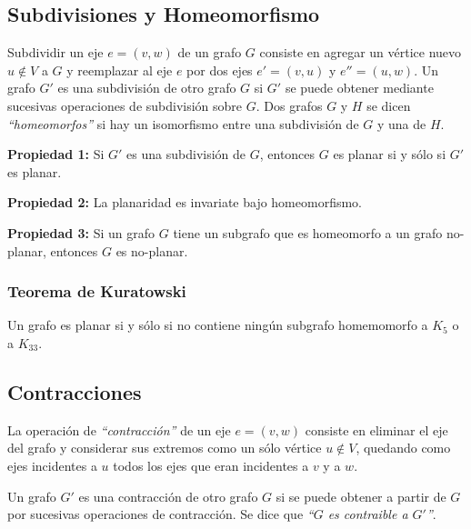 \subsection{Subdivisiones y Homeomorfismo}

Subdividir un eje $e = (v,w)$ de un grafo $G$ consiste en agregar un v\'ertice nuevo $u \not\in V$ a $G$ y reemplazar al eje $e$ por dos ejes $e' = (v, u)$ y $e'' = (u, w)$. Un grafo $G'$ es una subdivisi\'on de otro grafo $G$ si $G'$ se puede obtener mediante sucesivas operaciones de subdivisi\'on sobre $G$. Dos grafos $G$ y $H$ se dicen \emph{``homeomorfos''} si hay un isomorfismo entre una subdivisi\'on de $G$ y una de $H$.

\begin{badidea}
\textbf{Propiedad 1:} Si $G'$ es una subdivisi\'on de $G$, entonces $G$ es planar si y s\'olo si $G'$ es planar.
\end{badidea}

\begin{badidea}
\textbf{Propiedad 2:} La planaridad es invariate bajo homeomorfismo.
\end{badidea}

\begin{badidea}
\textbf{Propiedad 3:} Si un grafo $G$ tiene un subgrafo que es homeomorfo a un grafo no-planar, entonces $G$ es no-planar.
\end{badidea}

\subsubsection{Teorema de Kuratowski}

Un grafo es planar si y s\'olo si no contiene ning\'un subgrafo homemomorfo a $K_5$ o a $K_{33}$.

\subsection{Contracciones}

La operaci\'on de \emph{``contracci\'on''} de un eje $e = (v, w)$ consiste en eliminar el eje del grafo y considerar sus extremos como un s\'olo v\'ertice $u \not\in V$, quedando como ejes incidentes a $u$ todos los ejes que eran incidentes a $v$ y a $w$.

Un grafo $G'$ es una contracci\'on de otro grafo $G$ si se puede obtener a partir de $G$ por sucesivas operaciones de contracci\'on. Se dice que \emph{``$G$ es contraible a $G'$''}.

